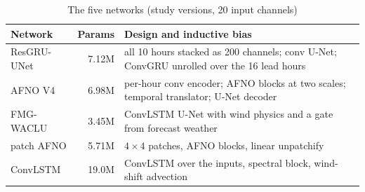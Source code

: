 \documentclass[conference]{IEEEtran}
\begin{document}
\begin{table}[!t]
\centering
\caption{The five networks (study versions, 20 input channels)}
\label{tab:models}
\setlength{\tabcolsep}{3pt}
\begin{tabular}{@{}lrp{}@{}}
\toprule
Network & Params & Design and inductive bias \\
\midrule
ResGRU-UNet & 7.12M & all 10 hours stacked as 200 channels; conv U-Net; ConvGRU unrolled over the 16 lead hours \\
AFNO V4 & 6.98M & per-hour conv encoder; AFNO blocks at two scales; temporal translator; U-Net decoder \\
FMG-WACLU & 3.45M & ConvLSTM U-Net with wind physics and a gate from forecast weather \\
patch AFNO & 5.71M & $4\times4$ patches, AFNO blocks, linear unpatchify \\
ConvLSTM & 19.0M & ConvLSTM over the inputs, spectral block, wind-shift advection \\
\bottomrule
\end{tabular}
\end{table}
\end{document}
